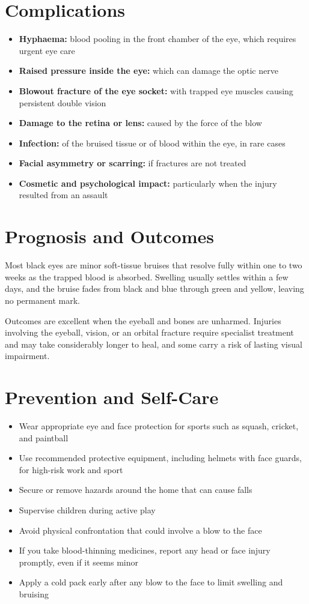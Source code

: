 \section*{Complications}
\begin{itemize}
    \item \textbf{Hyphaema:} blood pooling in the front chamber of the eye, which requires urgent eye care
    \item \textbf{Raised pressure inside the eye:} which can damage the optic nerve
    \item \textbf{Blowout fracture of the eye socket:} with trapped eye muscles causing persistent double vision
    \item \textbf{Damage to the retina or lens:} caused by the force of the blow
    \item \textbf{Infection:} of the bruised tissue or of blood within the eye, in rare cases
    \item \textbf{Facial asymmetry or scarring:} if fractures are not treated
    \item \textbf{Cosmetic and psychological impact:} particularly when the injury resulted from an assault
\end{itemize}

\section*{Prognosis and Outcomes}
Most black eyes are minor soft-tissue bruises that resolve fully within one to two weeks as the trapped blood is absorbed. Swelling usually settles within a few days, and the bruise fades from black and blue through green and yellow, leaving no permanent mark.

Outcomes are excellent when the eyeball and bones are unharmed. Injuries involving the eyeball, vision, or an orbital fracture require specialist treatment and may take considerably longer to heal, and some carry a risk of lasting visual impairment.

\section*{Prevention and Self-Care}
\begin{itemize}
    \item Wear appropriate eye and face protection for sports such as squash, cricket, and paintball
    \item Use recommended protective equipment, including helmets with face guards, for high-risk work and sport
    \item Secure or remove hazards around the home that can cause falls
    \item Supervise children during active play
    \item Avoid physical confrontation that could involve a blow to the face
    \item If you take blood-thinning medicines, report any head or face injury promptly, even if it seems minor
    \item Apply a cold pack early after any blow to the face to limit swelling and bruising
\end{itemize}

